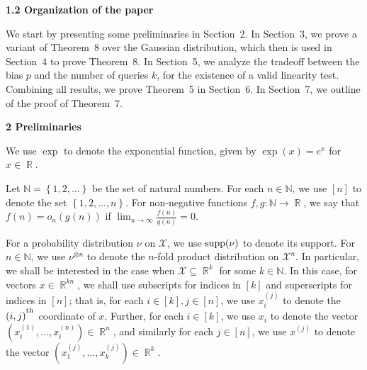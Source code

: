 \par\medskip\noindent\textbf{
1.2 Organization of the paper}\par




We start by presenting some preliminaries in Section 2.
In Section 3, we prove a variant of Theorem 8 over the Gaussian distribution, which then is used in Section 4 to prove Theorem 8.
In Section 5, we analyze the tradeoff between the bias $p$ and the number of queries $k$, for the existence of a valid linearity test.
Combining all results, we prove Theorem 5 in Section 6.
In Section 7, we outline of the proof of Theorem 7.\par






\par\medskip\noindent\textbf{
2 Preliminaries}\par




We use $\exp$ to denote the exponential function, given by $\exp(x)=e^{x}$ for $x\in\mathop{\mathbb{R}}$.\par




Let $\mathbb{N}=\left\{1,2,\dots\right\}$ be the set of natural numbers. For each $n\in\mathbb{N}$, we use $[n]$ to denote the set $\left\{1,2,\dots,n\right\}$.
For non-negative functions $f,g:\mathbb{N}\to\mathop{\mathbb{R}}$, we say that $f(n)=o_{n}(g(n))$ if $\lim_{n\to\infty}\frac{f(n)}{g(n)}=0$.\par




For a probability distribution $\nu$ on $\mathcal{X}$, we use $\textnormal{supp}(\nu)$ to denote its support.
For $n\in\mathbb{N}$, we use $\nu^{\otimes n}$ to denote the $n$-fold product distribution on $\mathcal{X}^{n}$.
In particular, we shall be interested in the case when $\mathcal{X}\subseteq\mathop{\mathbb{R}}^{k}$ for some $k\in\mathbb{N}$.
In this case, for vectors $x\in\mathop{\mathbb{R}}^{kn}$, we shall use subscripts for indices in $[k]$ and superscripts for indices in $[n]$; that is, for each $i\in[k],j\in[n]$, we use $x_{i}^{\left(j\right)}$ to denote the $(i,j)^{\textsuperscript{th}}$ coordinate of $x$.
Further, for each $i\in[k]$, we use $x_{i}$ to denote the vector $\left(x_{i}^{\left(1\right)},\dots,x_{i}^{\left(n\right)}\right)\in\mathop{\mathbb{R}}^{n}$, and similarly for each $j\in[n]$, we use $x^{\left(j\right)}$ to denote the vector $\left(x_{1}^{\left(j\right)},\dots,x_{k}^{\left(j\right)}\right)\in\mathop{\mathbb{R}}^{k}$.\par




